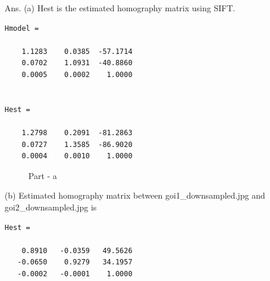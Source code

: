 \documentclass[11pt]{article}
\begin{document}
\begin{enumerate}
\begin{itemize}
\item[Ans.] (a) 
Hest is the estimated homography matrix using SIFT.
\begin{Verbatim}
Hmodel =

    1.1283    0.0385  -57.1714
    0.0702    1.0931  -40.8860
    0.0005    0.0002    1.0000


Hest =

    1.2798    0.2091  -81.2863
    0.0727    1.3585  -86.9020
    0.0004    0.0010    1.0000
\end{Verbatim}

\begin{figure}[h]
    \centering
    \qquad
	\qquad
	\caption{Part - a}
\end{figure}

(b) Estimated homography  matrix between goi1\_downsampled.jpg and goi2\_downsampled.jpg is 
\begin{verbatim}
Hest =

    0.8910   -0.0359   49.5626
   -0.0650    0.9279   34.1957
   -0.0002   -0.0001    1.0000
\end{verbatim}


\end{itemize}
\end{enumerate}
\end{document}
